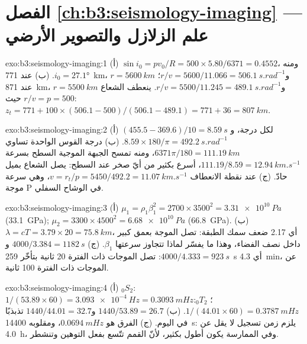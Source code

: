 \section*{الفصل \ref{ch:b3:seismology-imaging} --- علم الزلازل والتصوير الأرضي}

\begin{solution}{exo:b3:seismology-imaging:1}
(أ) $\sin i_0 = pv_0/R = 500\times5.80/6371 = 0.4552$، ومنه $i_0 = \ang{27.1}$.
(ب) عند \qty{771}{km}، $r = \qty{5600}{km}$ و$r/v = 5600/11.066 =
\qty{506.1}{s.rad^{-1}}$؛ عند \qty{871}{km}، $r = \qty{5500}{km}$ و$r/v =
5500/11.245 = \qty{489.1}{s.rad^{-1}}$. ينعطف الشعاع حيث $r/v = p = 500$:
$z_t = 771 + 100\times(506.1 - 500)/(506.1 - 489.1) = 771 + 36 =
\qty{807}{km}$.
\end{solution}

\begin{solution}{exo:b3:seismology-imaging:2}
(أ) $(455.5 - 369.6)/10 = \qty{8.59}{s}$ لكل درجة،
و$8.59\times180/\pi = \qty{492.2}{s.rad^{-1}}$. (ب) درجة القوس الواحدة تساوي
$6371\pi/180 = \qty{111.19}{km}$، ومنه تمسح الجبهة الموجية السطح بسرعة
$111.19/8.59 = \qty{12.94}{km.s^{-1}}$، أسرع بكثير من أيّ صخر عند
السطح: يصل الشعاع بميل حادّ. (ج) عند نقطة الانعطاف $v = r_t/p =
5450/492.2 = \qty{11.07}{km.s^{-1}}$، وهي سرعة موجة P في الوشاح السفلي.
\end{solution}

\begin{solution}{exo:b3:seismology-imaging:3}
(أ) $\mu_1 = \rho_1\beta_1^2 = 2700\times3500^2 = \qty{3.31e10}{Pa}$
(\qty{33.1}{GPa}); $\mu_2 = 3300\times4500^2 = \qty{6.68e10}{Pa}$
(\qty{66.8}{GPa}). (ب) $\lambda = cT = 3.79\times20 = \qty{75.8}{km}$، أي 2.17
ضعف سمك الطبقة: تصل الموجة بعمق كبير داخل نصف الفضاء، وهذا ما
يفسّر لماذا تتجاوز سرعتها $\beta_1$. (ج) $4000/3.384 = \qty{1182}{s}$
و$4000/4.333 = \qty{923}{s}$: تصل الموجات ذات الفترة 20 ثانية بتأخّر \qty{259}{s} أي
\qty{4.3}{min}، عن الموجات ذات الفترة 100 ثانية.
\end{solution}

\begin{solution}{exo:b3:seismology-imaging:4}
(أ) ${}_0S_2$: $1/(53.89\times60) = \qty{3.093e-4}{Hz} = \qty{0.3093}{mHz}$؛
${}_0T_2$: $1/(44.01\times60) = \qty{0.3787}{mHz}$. (ب) $1440/53.89 = 26.7$
و$1440/44.01 = 32.7$ تذبذبًا في اليوم. (ج) الفرق هو
$\qty{0.0694}{mHz}$، ومقلوبه \qty{14400}{s}: يلزم زمن تسجيل لا يقل عن \qty{4.0}{h}،
وفي الممارسة يكون أطول بكثير، لأنّ القمم تتّسع بفعل التوهين
وتنشطر.
\end{solution}

